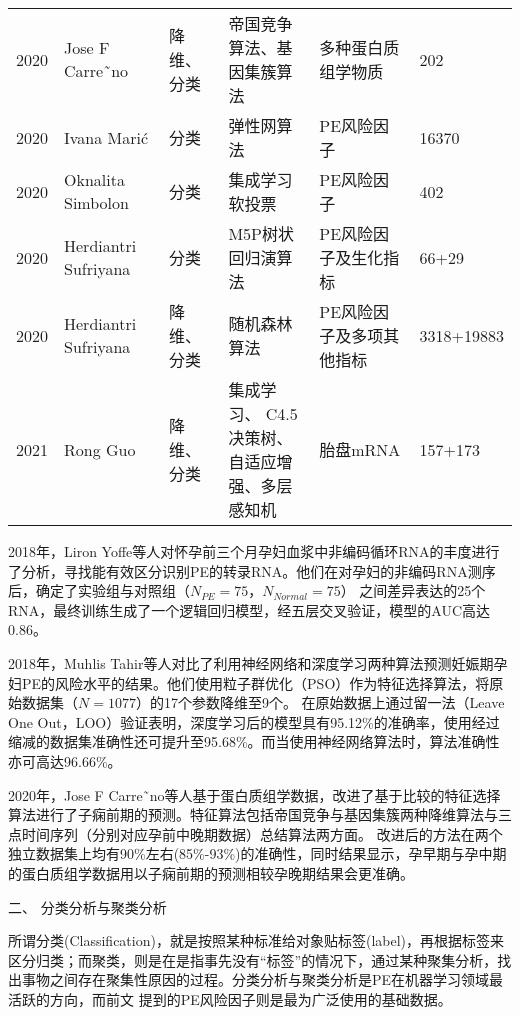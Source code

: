 \begin{landscape}
\begin{longtable}{m{1cm}<{\centering}m{4cm}<{\centering}m{3cm}<{\centering}m{4.5cm}<{\centering}m{4.5cm}<{\centering}m{2cm}<{\centering}}
        2020&Jose F Carre˜no\cite{Carreno2020}&降维、分类&帝国竞争算法、基因集簇算法&多种蛋白质组学物质&202\\
        2020&Ivana Mari{\'{c}}\cite{Maric2020}&分类&弹性网算法&PE风险因子&16370\\
        2020&Oknalita Simbolon\cite{Simbolon2020}&分类&集成学习软投票&PE风险因子&402\\
        2020&Herdiantri Sufriyana\cite{Sufriyana2020-1}&分类&M5P树状回归演算法&PE风险因子及生化指标&66+29\\
        2020&Herdiantri Sufriyana\cite{Sufriyana2020}&降维、分类&随机森林算法&PE风险因子及多项其他指标&3318+19883\\
        2021&Rong Guo\cite{Guo2021}&降维、分类&\tabincell{c}{集成学习、 C4.5决策树、\\自适应增强、多层感知机}&胎盘mRNA&157+173\\
	\end{longtable}
\end{landscape}

2018年，Liron Yoffe等人\cite{Yoffe2018}对怀孕前三个月孕妇血浆中非编码循环RNA的丰度进行了分析，寻找能有效区分识别PE的转录RNA。他们在对孕妇的非编码RNA测序后，确定了实验组与对照组（$N_{PE}=75$，$N_{Normal}=75$）
之间差异表达的25个RNA，最终训练生成了一个逻辑回归模型，经五层交叉验证，模型的AUC高达0.86。

2018年，Muhlis Tahir等人\cite{Tahir2018,Tahir2018-2}对比了利用神经网络和深度学习两种算法预测妊娠期孕妇PE的风险水平的结果。他们使用粒子群优化（PSO）作为特征选择算法，将原始数据集（$N=1077$）的17个参数降维至9个。
在原始数据上通过留一法（Leave One Out，LOO）验证表明，深度学习后的模型具有95.12\%的准确率，使用经过缩减的数据集准确性还可提升至95.68\%。而当使用神经网络算法时，算法准确性亦可高达96.66\%。

2020年，Jose F Carre˜no等人\cite{Carreno2020}基于蛋白质组学数据，改进了基于比较的特征选择算法进行了子痫前期的预测。特征算法包括帝国竞争与基因集簇两种降维算法与三点时间序列（分别对应孕前中晚期数据）总结算法两方面。
改进后的方法在两个独立数据集上均有90\%左右(85\%-93\%)的准确性，同时结果显示，孕早期与孕中期的蛋白质组学数据用以子痫前期的预测相较孕晚期结果会更准确。

二、 分类分析与聚类分析

所谓分类(Classification)，就是按照某种标准给对象贴标签(label)，再根据标签来区分归类；而聚类，则是在是指事先没有“标签”的情况下，通过某种聚集分析，找出事物之间存在聚集性原因的过程。分类分析与聚类分析是PE在机器学习领域最活跃的方向，而前文
提到的PE风险因子则是最为广泛使用的基础数据。

